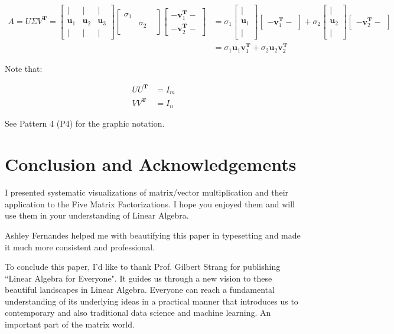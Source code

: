 \documentclass[letterpaper]{article}
\begin{document}
\begin{align*}
  A = U \Sigma V^\mathbf{T} =
  \begin{bmatrix}
    | & | & |\\
    \bm{u}_1 & \bm{u}_2 & \bm{u}_3\\
    | & | & |
  \end{bmatrix}
  \begin{bmatrix}
    \sigma_1 \\
           & \sigma_2 \\
           & &
  \end{bmatrix}
  \begin{bmatrix}
  - \bm{v}_1^\mathbf{T} -\\
  - \bm{v}_2^\mathbf{T} -
  \end{bmatrix}
  & =
  \sigma_1 \begin{bmatrix}
    |\\
    \bm{u}_1\\
    |
  \end{bmatrix}
  \begin{bmatrix}
    - \bm{v}_1^\mathbf{T} - 
  \end{bmatrix}
  +
  \sigma_2 \begin{bmatrix}
  |\\
  \bm{u}_2\\
  |
  \end{bmatrix}
  \begin{bmatrix}
  - \bm{v}_2^\mathbf{T} -
  \end{bmatrix} \\
& = \sigma_1 \bm{u}_1 \bm{v}_1^\mathbf{T} + \sigma_2 \bm{u}_2 \bm{v}_2^\mathbf{T}
\end{align*}

Note that:

\begin{align*}
  U U^\mathbf{T} &= I_m \\
  V V^\mathbf{T} &= I_n
\end{align*}

See Pattern 4 (P4) for the graphic notation.

\section*{Conclusion and Acknowledgements}

I presented systematic visualizations of matrix/vector multiplication and
their application to the Five Matrix Factorizations. I hope you
enjoyed them and will use them
in your understanding of Linear Algebra.

Ashley Fernandes helped me with beautifying this paper in typesetting
and made it much more consistent and professional.

To conclude this paper, I'd like to thank Prof. Gilbert Strang for
publishing ``Linear Algebra for Everyone". It guides us
through a new vision to these beautiful landscapes in Linear Algebra.
Everyone can reach a fundamental understanding of its underlying ideas
in a practical manner that introduces us to contemporary and also
traditional data science and machine learning. An important part of the matrix world.
\end{document}
